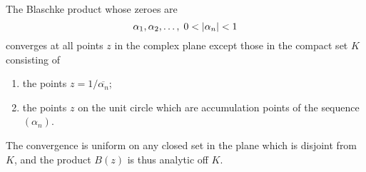 \begin{theorem}
    The Blaschke product whose zeroes are 
    $$\alpha_{1}, \alpha_{2} , \ldots, \; 0 < \left\lvert \alpha_{n} \right\rvert < 1$$
    converges at all points $z$ in the complex plane except those in the compact set $K$ consisting of 
    \begin{enumerate}[label=(\roman*)]
	\item the points $z=1/\overline{\alpha_{n}}$;
	\item the points $z$ on the unit circle which are accumulation points of the sequence $\left( \alpha_{n} \right)$.
    \end{enumerate}
    The convergence is uniform on any closed set in the plane which is disjoint from $K$, and the product $B\left( z \right)$ is thus analytic off $K$.
    \label{thm:blaschke-singular-analytic-more-disc}
\end{theorem}
